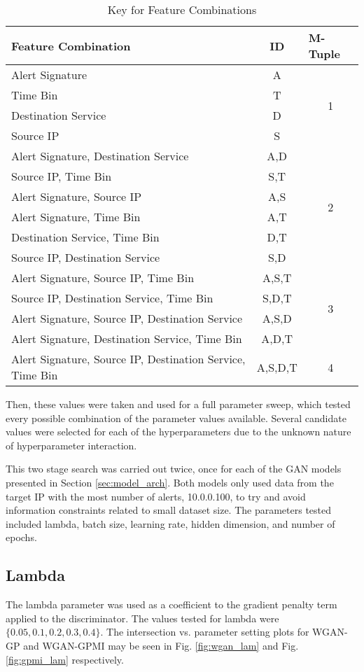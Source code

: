 \begin{table}[!htbp]
	\caption{Key for Feature Combinations}
	\label{tab:key}
	\centering
	\begin{tabular}{l|c|c}
		\textbf{Feature Combination} & \textbf{ID} & \multicolumn{1}{l}{\textbf{M-Tuple}} \\ \hline
		Alert Signature & A & \multirow{4}{*}{1} \\
		Time Bin & T &  \\
		Destination Service & D &  \\
		Source IP & S &  \\ \hline
		Alert Signature, Destination Service & A,D & \multirow{6}{*}{2} \\
		Source IP, Time Bin & S,T &  \\
		Alert Signature, Source IP & A,S &  \\
		Alert Signature, Time Bin & A,T &  \\
		Destination Service, Time Bin & D,T &  \\
		Source IP, Destination Service & S,D &  \\ \hline
		Alert Signature, Source IP, Time Bin & A,S,T & \multirow{4}{*}{3} \\
		Source IP, Destination Service, Time Bin & S,D,T &  \\
		Alert Signature, Source IP, Destination Service & A,S,D &  \\
		Alert Signature, Destination Service, Time Bin & A,D,T &  \\ \hline
		Alert Signature, Source IP, Destination Service, Time Bin & A,S,D,T & 4
	\end{tabular}
\end{table}

Then, these values were taken and used for a full parameter sweep, which tested every possible combination of the parameter values available. Several candidate values were selected for each of the hyperparameters due to the unknown nature of hyperparameter interaction.

This two stage search was carried out twice, once for each of the GAN models presented in Section \ref{sec:model_arch}. Both models only used data from the target IP with the most number of alerts, 10.0.0.100, to try and avoid information constraints related to small dataset size. The parameters tested included lambda, batch size, learning rate, hidden dimension, and number of epochs.

\subsection{Lambda}
\label{sec:lam}
The lambda parameter was used as a coefficient to the gradient penalty term applied to the discriminator. The values tested for lambda were $\{0.05, 0.1, 0.2, 0.3, 0.4\}$. The intersection vs. parameter setting plots for WGAN-GP and WGAN-GPMI may be seen in Fig. \ref{fig:wgan_lam} and Fig. \ref{fig:gpmi_lam} respectively.

